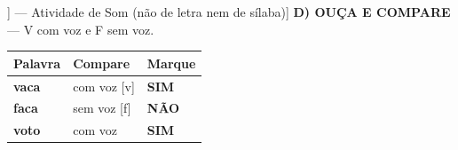 \begin{exercicio}[Som /v/ [[v]] --- Atividade de Som (não de letra nem de sílaba)]
\textbf{D) OUÇA E COMPARE} --- V com voz e F sem voz.

\begin{center}
\begin{tabular}{@{}p{4.2cm}p{6.2cm}p{1.6cm}@{}}
\hline
\textbf{Palavra} & \textbf{Compare} & \textbf{Marque} \\
\hline
\textbf{vaca} & com voz [v] & \textbf{SIM} \\
\textbf{faca} & sem voz [f] & \textbf{NÃO} \\
\textbf{voto} & com voz & \textbf{SIM} \\
\hline
\end{tabular}
\end{center}

\end{exercicio}


